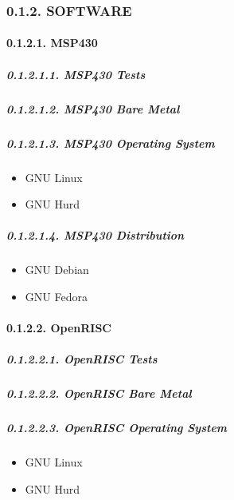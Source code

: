 \documentclass[
]{article}
\begin{document}
\hypertarget{software-1}{%
\subsubsection{0.1.2. SOFTWARE}\label{software-1}}

\hypertarget{msp430-3}{%
\paragraph{0.1.2.1. MSP430}\label{msp430-3}}

\hypertarget{msp430-tests-1}{%
\subparagraph{0.1.2.1.1. MSP430 Tests}\label{msp430-tests-1}}

\hypertarget{msp430-bare-metal-1}{%
\subparagraph{0.1.2.1.2. MSP430 Bare Metal}\label{msp430-bare-metal-1}}

\hypertarget{msp430-operating-system-1}{%
\subparagraph{0.1.2.1.3. MSP430 Operating
System}\label{msp430-operating-system-1}}

\begin{itemize}
\item
  GNU Linux
\item
  GNU Hurd
\end{itemize}

\hypertarget{msp430-distribution-1}{%
\subparagraph{0.1.2.1.4. MSP430
Distribution}\label{msp430-distribution-1}}

\begin{itemize}
\item
  GNU Debian
\item
  GNU Fedora
\end{itemize}

\hypertarget{openrisc-3}{%
\paragraph{0.1.2.2. OpenRISC}\label{openrisc-3}}

\hypertarget{openrisc-tests-1}{%
\subparagraph{0.1.2.2.1. OpenRISC Tests}\label{openrisc-tests-1}}

\hypertarget{openrisc-bare-metal-1}{%
\subparagraph{0.1.2.2.2. OpenRISC Bare
Metal}\label{openrisc-bare-metal-1}}

\hypertarget{openrisc-operating-system-1}{%
\subparagraph{0.1.2.2.3. OpenRISC Operating
System}\label{openrisc-operating-system-1}}

\begin{itemize}
\item
  GNU Linux
\item
  GNU Hurd
\end{itemize}
\end{document}
